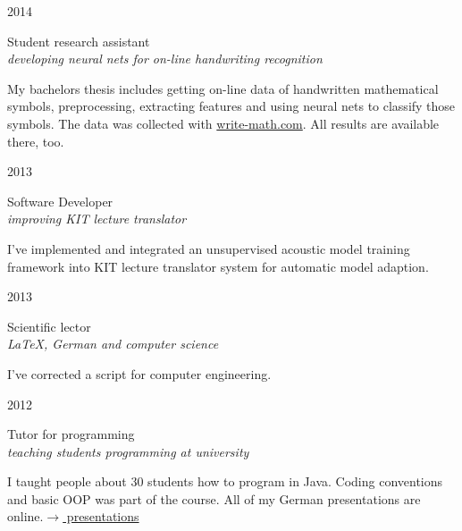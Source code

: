 \documentclass[a4paper,10pt]{article} %
\begin{document}
{\begin{minipage}[t]{0.5\textwidth}
{\raggedleft\textsc{2014}\par}

{\raggedright\large Student research assistant\\
\textit{developing neural nets for on-line handwriting recognition}\\[5pt]}

\normalsize{My bachelors thesis includes getting on-line data of handwritten
mathematical symbols, preprocessing, extracting features and using neural nets
to classify those symbols. The data was collected with \href{http://write-math.com}{write-math.com}. All results are available there, too.}\\


{\raggedleft\textsc{2013}\par}

{\raggedright\large Software Developer\\
\textit{improving KIT lecture translator}\\[5pt]}

\normalsize{I've implemented and integrated an unsupervised acoustic model training framework into KIT lecture translator system for automatic model adaption.}\\


{\raggedleft\textsc{2013}\par}

{\raggedright\large Scientific lector\\
\textit{\LaTeX{}, German and computer science}\\[5pt]}

\normalsize{I've corrected a script for computer engineering.}\\


{\raggedleft\textsc{2012}\par}

{\raggedright\large Tutor for programming\\
\textit{teaching students programming at university}\\[5pt]}

\normalsize{I taught people about 30 students how to program in Java.
Coding conventions and basic OOP was part of the course. All of my German presentations are online.}\hfill \href{http://martin-thoma.com/programmieren-tutorium/#Folien}{$\rightarrow$ presentations}\\


\end{minipage}}
\end{document}
